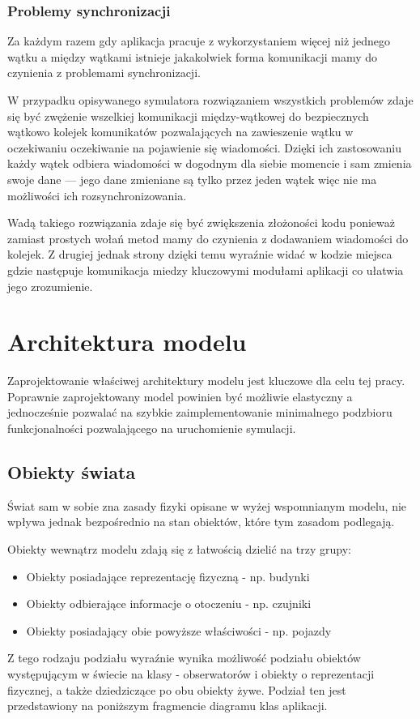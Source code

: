 \subsubsection{Problemy synchronizacji}
\par{
Za każdym razem gdy aplikacja pracuje z wykorzystaniem więcej niż jednego wątku a między wątkami istnieje jakakolwiek forma komunikacji mamy do czynienia z problemami synchronizacji.
}
\par{
W przypadku opisywanego symulatora rozwiązaniem wszystkich problemów zdaje się być zwężenie wszelkiej komunikacji między-wątkowej do bezpiecznych wątkowo  kolejek komunikatów pozwalających na zawieszenie wątku w oczekiwaniu oczekiwanie na pojawienie się wiadomości. Dzięki ich zastosowaniu każdy wątek odbiera wiadomości w dogodnym dla siebie momencie i sam zmienia swoje dane --- jego dane zmieniane są tylko przez jeden wątek więc nie ma możliwości ich rozsynchronizowania.
\par{
Wadą takiego rozwiązania zdaje się być zwiększenia złożoności kodu ponieważ zamiast prostych wołań metod mamy do czynienia z dodawaniem wiadomości do kolejek. Z drugiej jednak strony dzięki temu wyraźnie widać w kodzie miejsca gdzie następuje komunikacja miedzy kluczowymi modułami aplikacji co ułatwia jego zrozumienie.
}


\section[Architektura modelu][Architektura modelu]{Architektura modelu}
\par{
Zaprojektowanie właściwej architektury modelu jest kluczowe dla celu tej pracy. Poprawnie zaprojektowany model powinien być możliwie elastyczny a jednocześnie pozwalać na szybkie zaimplementowanie minimalnego podzbioru funkcjonalności pozwalającego na uruchomienie symulacji.
}
\subsection{Obiekty świata}
\par{
Świat sam w sobie zna zasady fizyki opisane w wyżej wspomnianym modelu, nie wpływa jednak bezpośrednio na stan obiektów, które tym zasadom podlegają.
}
\par{
Obiekty wewnątrz modelu zdają się z łatwością dzielić na trzy grupy:
\begin{itemize}
\item Obiekty posiadające reprezentację fizyczną - np. budynki
\item Obiekty odbierające informacje o otoczeniu - np. czujniki
\item Obiekty posiadający obie powyższe właściwości - np. pojazdy
\end{itemize}
Z tego rodzaju podziału wyraźnie wynika możliwość podziału obiektów występującym w świecie na klasy - obserwatorów i obiekty o reprezentacji fizycznej, a także dziedziczące po obu obiekty żywe. Podział ten jest przedstawiony na poniższym fragmencie diagramu klas aplikacji.
}

}

